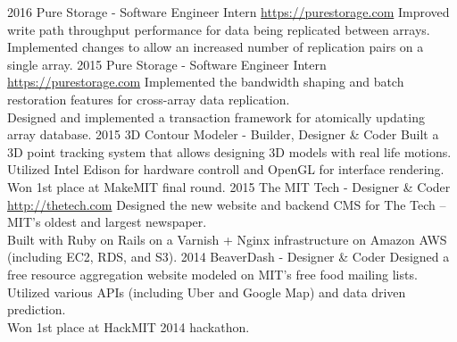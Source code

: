 \documentclass[__VERSION__]{friggeri-cv} %
\begin{document}
\begin{entrylist}
  \entry
  {2016}
  {Pure Storage - Software Engineer Intern}
  {\href{https://purestorage.com}{https://purestorage.com}}
  {Improved write path throughput performance for data being replicated between arrays. \\
  Implemented changes to allow an increased number of replication pairs on a single array. }
  \entry
  {2015}
  {Pure Storage - Software Engineer Intern}
  {\href{https://purestorage.com}{https://purestorage.com}}
  {Implemented the bandwidth shaping and batch restoration features for cross-array data replication. \\
  Designed and implemented a transaction framework for atomically updating array database. }
  \entry
  {2015}
  {3D Contour Modeler - Builder, Designer \& Coder}
  {}
  {Built a 3D point tracking system that allows designing 3D models with real life motions. \\
  Utilized Intel Edison for hardware controll and OpenGL for interface rendering. \\
  Won 1st place at MakeMIT final round. }
  \entry
  {2015}
  {The MIT Tech - Designer \& Coder}
  {\href{http://thetech.com}{http://thetech.com}}
  {Designed the new website and backend CMS for The Tech -- MIT's oldest and largest newspaper. \\
  Built with Ruby on Rails on a Varnish + Nginx infrastructure on Amazon AWS (including EC2, RDS, and S3). }
  \entry
  {2014}
  {BeaverDash - Designer \& Coder}
  {}
  {Designed a free resource aggregation website modeled on MIT's free food mailing lists. \\
  Utilized various APIs (including Uber and Google Map) and data driven prediction. \\
  Won 1st place at HackMIT 2014 hackathon. }

\end{entrylist}
\end{document}
